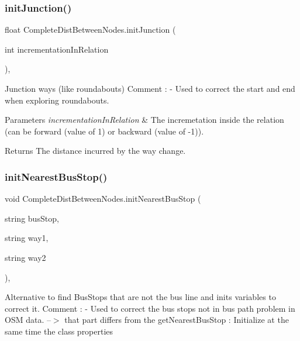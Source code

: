 \subsubsection{\texorpdfstring{init\+Junction()}{initJunction()}}
{\footnotesize\ttfamily float Complete\+Dist\+Between\+Nodes.\+init\+Junction (\begin{DoxyParamCaption}\item[{int}]{incrementation\+In\+Relation }\end{DoxyParamCaption})\hspace{0.3cm}{\ttfamily [inline]}, {\ttfamily [private]}}



Junction ways (like roundabouts) Comment \+: -\/ Used to correct the start and end when exploring roundabouts. 


\begin{DoxyParams}{Parameters}
{\em incrementation\+In\+Relation} & The incremetation inside the relation (can be forward (value of 1) or backward (value of -\/1)).\\
\hline
\end{DoxyParams}
\begin{DoxyReturn}{Returns}
The distance incurred by the way change.
\end{DoxyReturn}
\mbox{\label{classCompleteDistBetweenNodes_a348b45abac3f6e740958e27829b29f8c}} 
\subsubsection{\texorpdfstring{init\+Nearest\+Bus\+Stop()}{initNearestBusStop()}}
{\footnotesize\ttfamily void Complete\+Dist\+Between\+Nodes.\+init\+Nearest\+Bus\+Stop (\begin{DoxyParamCaption}\item[{string}]{bus\+Stop,  }\item[{string}]{way1,  }\item[{string}]{way2 }\end{DoxyParamCaption})\hspace{0.3cm}{\ttfamily [inline]}, {\ttfamily [private]}}



Alternative to find Bus\+Stops that are not the bus line and inits variables to correct it. Comment \+: -\/ Used to correct the bus stops not in bus path problem in O\+SM data. --$>$ that part differs from the get\+Nearest\+Bus\+Stop \+: Initialize at the same time the class properties 


